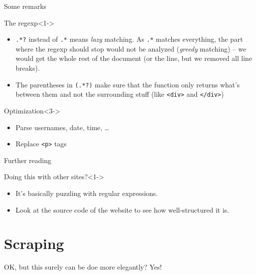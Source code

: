 \documentclass{beamer}
\begin{document}
\begin{frame}{Some remarks}
\begin{block}{The regexp}<1->
\begin{itemize}
\item {\tt{.*?}} instead of {\tt{.*}} means \emph{lazy} matching. As  {\tt{.*}} matches everything, the part where the regexp should stop would not be analyzed (\emph{greedy} matching) -- we would get the whole rest of the document (or the line, but we removed all line breaks).
\item<2->The parentheses in {\tt{(.*?)}} make sure that the function only returns what's between them and not the surrounding stuff (like {\tt{<div>}} and {\tt{</div>}})
\end{itemize}
\end{block}
\begin{block}{Optimization}<3->
\begin{itemize}
\item Parse usernames, date, time, \ldots
\item Replace \texttt{<p>} tags
\end{itemize}
\end{block}

\end{frame}



\begin{frame}{Further reading}

\begin{block}{Doing this with other sites?}<1->
\begin{itemize}
\item It's basically puzzling with regular expressions. 
\item Look at the source code of the website to see how well-structured it is.
\end{itemize}
\end{block}

\end{frame}



\section{Scraping}
\begin{frame}
OK, but this surely can be doe more elegantly? Yes!
\end{frame}
\end{document}
